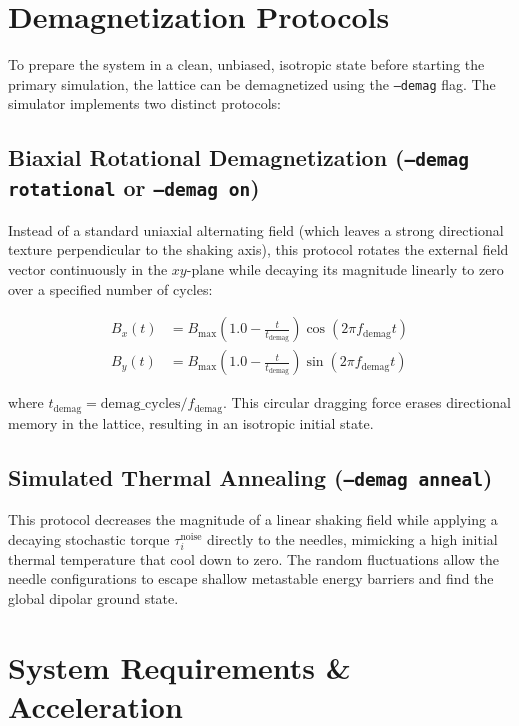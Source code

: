\documentclass[11pt,a4paper]{article}
\newcommand{\code}[1]{\texttt{#1}}
\begin{document}
\section{Demagnetization Protocols}
\label{sec:demag}

To prepare the system in a clean, unbiased, isotropic state before starting the primary simulation, the lattice can be demagnetized using the \code{--demag} flag. The simulator implements two distinct protocols:

\subsection{Biaxial Rotational Demagnetization (\code{--demag rotational} or \code{--demag on})}
Instead of a standard uniaxial alternating field (which leaves a strong directional texture perpendicular to the shaking axis), this protocol rotates the external field vector continuously in the $xy$-plane while decaying its magnitude linearly to zero over a specified number of cycles:

\begin{align}
B_x(t) &= B_{\max} \left(1.0 - \frac{t}{t_{\text{demag}}}\right) \cos(2\pi f_{\text{demag}} t) \\
B_y(t) &= B_{\max} \left(1.0 - \frac{t}{t_{\text{demag}}}\right) \sin(2\pi f_{\text{demag}} t)
\end{align}

\noindent
where $t_{\text{demag}} = \text{demag\_cycles} / f_{\text{demag}}$. This circular dragging force erases directional memory in the lattice, resulting in an isotropic initial state.

\subsection{Simulated Thermal Annealing (\code{--demag anneal})}
This protocol decreases the magnitude of a linear shaking field while applying a decaying stochastic torque $\tau_i^{\text{noise}}$ directly to the needles, mimicking a high initial thermal temperature that cool down to zero. The random fluctuations allow the needle configurations to escape shallow metastable energy barriers and find the global dipolar ground state.

\section{System Requirements \& Acceleration}
\label{sec:acceleration}
\end{document}
